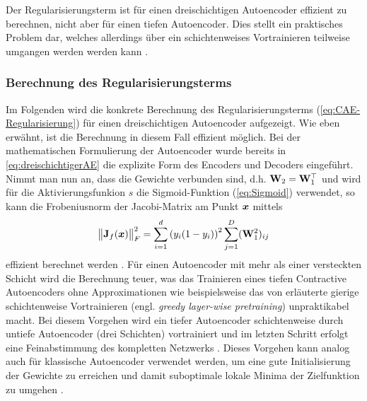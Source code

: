 Der Regularisierungsterm ist für einen dreischichtigen Autoencoder effizient zu berechnen, nicht
aber für einen tiefen Autoencoder. Dies stellt ein praktisches Problem dar, welches allerdings über
ein schichtenweises Vortrainieren teilweise umgangen werden werden kann \parencite[vgl.][522]{Goodfellow.2016}.

\subsubsection{Berechnung des Regularisierungsterms}
\label{ch:MethodenDerDimRed:ML:CAE:BerechnungRegTerm}
Im Folgenden wird die konkrete Berechnung des Regularisierungsterms (\eqref{eq:CAE-Regularisierung}) für einen dreischichtigen Autoencoder aufgezeigt. Wie eben erwähnt, ist die Berechnung in diesem Fall effizient möglich. Bei der mathematischen Formulierung der Autoencoder wurde bereits in \eqref{eq:dreischichtigerAE} die explizite Form des Encoders und Decoders eingeführt. Nimmt man nun an, dass die Gewichte verbunden sind, d.h. $\mathbf{W}_2 = \mathbf{W}_1^\top$ und wird für die Aktivierungsfunkion $s$ die Sigmoid-Funktion (\eqref{eq:Sigmoid})
verwendet, so kann die Frobeniusnorm der Jacobi-Matrix am Punkt $\bm{x}$ mittels
\begin{equation}
	\label{eq:CAE-loss-simple}
	\norm[\big]{\mat{J}_f(\vect{x})}_F^2 = \sum_{i = 1}^d \left( y_i (1 - y_i)\right)^2 \sum_{j = 1}^D (\mat{W}_1^2)_{ij}
\end{equation}
effizient berechnet werden \parencite[4]{Rifai.2011a}. Für einen Autoencoder mit mehr als einer versteckten Schicht wird die
Berechnung teuer, was das Trainieren eines tiefen Contractive Autoencoders ohne Approximationen wie
beispielsweise das von \textcite{Bengio.2006} erläuterte gierige schichtenweise Vortrainieren
(engl. \textit{greedy layer-wise pretraining}) unpraktikabel macht. Bei diesem Vorgehen wird ein
tiefer Autoencoder schichtenweise durch untiefe Autoencoder (drei Schichten) vortrainiert und im
letzten Schritt erfolgt eine Feinabstimmung des kompletten Netzwerks \parencite[522]{Goodfellow.2016}. Dieses Vorgehen kann analog auch für klassische Autoencoder verwendet
werden, um eine gute Initialisierung der Gewichte zu erreichen und damit suboptimale lokale Minima
der Zielfunktion zu umgehen \parencite[509]{Goodfellow.2016}.